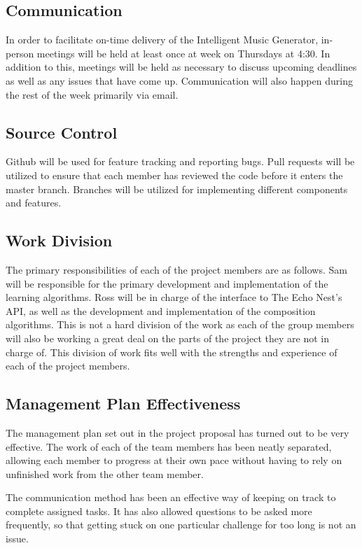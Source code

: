 \documentclass{article}
\begin{document}
\subsection{Communication}
In order to facilitate on-time delivery of the Intelligent Music Generator, in-person meetings 
will be held at least once at week on Thursdays at 4:30. In addition to this, meetings will be 
held as necessary to discuss upcoming deadlines as well as any issues that have come up. 
Communication will also happen during the rest of the week primarily via email.


\subsection{Source Control}
Github will be used for feature tracking and reporting bugs.  Pull requests will be utilized to 
ensure that each member has reviewed the code before it enters the master branch.  Branches will 
be utilized for implementing different components and features.

\subsection{Work Division}
The primary responsibilities of each of the project members are as follows. Sam will be 
responsible for the primary development and implementation of the learning algorithms. Ross will 
be in charge of the interface to The Echo Nest's API, as well as the development and 
implementation of the composition algorithms. This is not a hard division of the work as each of 
the group members will also be working a great deal on the parts of the project they are not in 
charge of. This division of work fits well with the strengths and experience of each of the 
project members.

\subsection{Management Plan Effectiveness}
The management plan set out in the project proposal has turned out to be very effective. The work
of each of the team members has been neatly separated, allowing each member to progress at their
own pace without having to rely on unfinished work from the other team member. 

The communication method has been an effective way of keeping on track to complete assigned tasks. 
It has also allowed questions to be asked more frequently, so that getting stuck on one particular 
challenge for too long is not an issue.
\end{document}
